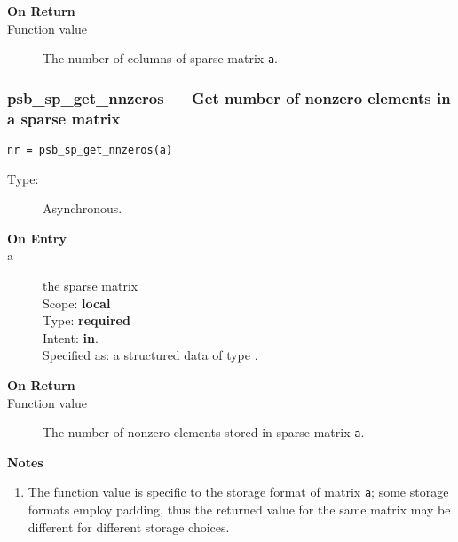 \begin{description}
\item[\bf On Return]
\item[Function value] The number of  columns  of sparse matrix \verb|a|.
\end{description}


\subsubsection*{psb\_sp\_get\_nnzeros --- Get number of nonzero elements
  in a sparse matrix}

\begin{verbatim}
nr = psb_sp_get_nnzeros(a)
\end{verbatim}

\begin{description}
\item[Type:] Asynchronous.
\item[\bf On Entry]
\item[a] the sparse matrix\\
Scope: {\bf local}\\
Type: {\bf required}\\
Intent: {\bf in}.\\
Specified as: a structured data of type \spdata.
\end{description}

\begin{description}
\item[\bf On Return]
\item[Function value] The number of nonzero elements stored in sparse matrix \verb|a|.
\end{description}

{\par\noindent\bfseries Notes}
\begin{enumerate}
\item The function value is specific to the storage format of matrix
  \verb|a|; some storage formats employ padding, thus the returned
  value for the same matrix may be different for different storage choices.
\end{enumerate}



